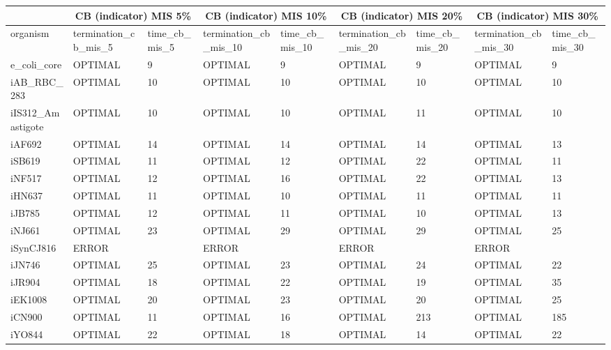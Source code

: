 \begin{table}[!ht]
    \small
    \centering
    \begin{tabular}{|l|l|l|l|l|l|l|l|l|}
    \hline
        \multicolumn{1}{|c}{} & \multicolumn{2}{|c|}{CB (indicator) MIS 5\%} & \multicolumn{2}{|c|}{CB (indicator) MIS 10\%} & \multicolumn{2}{|c|}{CB (indicator) MIS 20\%} & \multicolumn{2}{|c|}{CB (indicator) MIS 30\%} \\ \hline
        organism & termination\_cb\_mis\_5 & time\_cb\_mis\_5 & termination\_cb\_mis\_10 & time\_cb\_mis\_10 & termination\_cb\_mis\_20 & time\_cb\_mis\_20 & termination\_cb\_mis\_30 & time\_cb\_mis\_30 \\ \hline
        e\_coli\_core & OPTIMAL & 9 & OPTIMAL & 9 & OPTIMAL & 9 & OPTIMAL & 9 \\ \hline
        iAB\_RBC\_283 & OPTIMAL & 10 & OPTIMAL & 10 & OPTIMAL & 10 & OPTIMAL & 10 \\ \hline
        iIS312\_Amastigote & OPTIMAL & 10 & OPTIMAL & 10 & OPTIMAL & 11 & OPTIMAL & 10 \\ \hline
        iAF692 & OPTIMAL & 14 & OPTIMAL & 14 & OPTIMAL & 14 & OPTIMAL & 13 \\ \hline
        iSB619 & OPTIMAL & 11 & OPTIMAL & 12 & OPTIMAL & 22 & OPTIMAL & 11 \\ \hline
        iNF517 & OPTIMAL & 12 & OPTIMAL & 16 & OPTIMAL & 22 & OPTIMAL & 13 \\ \hline
        iHN637 & OPTIMAL & 11 & OPTIMAL & 10 & OPTIMAL & 11 & OPTIMAL & 11 \\ \hline
        iJB785 & OPTIMAL & 12 & OPTIMAL & 11 & OPTIMAL & 10 & OPTIMAL & 13 \\ \hline
        iNJ661 & OPTIMAL & 23 & OPTIMAL & 29 & OPTIMAL & 29 & OPTIMAL & 25 \\ \hline
        iSynCJ816 & ERROR & ~ & ERROR & ~ & ERROR & ~ & ERROR & ~ \\ \hline
        iJN746 & OPTIMAL & 25 & OPTIMAL & 23 & OPTIMAL & 24 & OPTIMAL & 22 \\ \hline
        iJR904 & OPTIMAL & 18 & OPTIMAL & 22 & OPTIMAL & 19 & OPTIMAL & 35 \\ \hline
        iEK1008 & OPTIMAL & 20 & OPTIMAL & 23 & OPTIMAL & 20 & OPTIMAL & 25 \\ \hline
        iCN900 & OPTIMAL & 11 & OPTIMAL & 16 & OPTIMAL & 213 & OPTIMAL & 185 \\ \hline
        iYO844 & OPTIMAL & 22 & OPTIMAL & 18 & OPTIMAL & 14 & OPTIMAL & 22 \\ \hline

\end{tabular}
\end{table}
